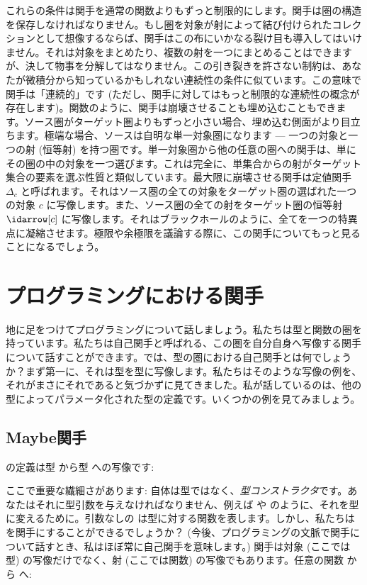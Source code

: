 \noindent
これらの条件は関手を通常の関数よりもずっと制限的にします。関手は圏の構造を保存しなければなりません。もし圏を対象が射によって結び付けられたコレクションとして想像するならば、関手はこの布にいかなる裂け目も導入してはいけません。それは対象をまとめたり、複数の射を一つにまとめることはできますが、決して物事を分解してはなりません。この引き裂きを許さない制約は、あなたが微積分から知っているかもしれない連続性の条件に似ています。この意味で関手は「連続的」です (ただし、関手に対してはもっと制限的な連続性の概念が存在します)。関数のように、関手は崩壊させることも埋め込むこともできます。ソース圏がターゲット圏よりもずっと小さい場合、埋め込む側面がより目立ちます。極端な場合、ソースは自明な単一対象圏になります --- 一つの対象と一つの射 (恒等射) を持つ圏です。単一対象圏から他の任意の圏への関手は、単にその圏の中の対象を一つ選びます。これは完全に、単集合からの射がターゲット集合の要素を選ぶ性質と類似しています。最大限に崩壊させる関手は定値関手 $\Delta_c$ と呼ばれます。それはソース圏の全ての対象をターゲット圏の選ばれた一つの対象 $c$ に写像します。また、ソース圏の全ての射をターゲット圏の恒等射 $\idarrow[c]$ に写像します。それはブラックホールのように、全てを一つの特異点に凝縮させます。極限や余極限を議論する際に、この関手についてもっと見ることになるでしょう。

\section{プログラミングにおける関手}

地に足をつけてプログラミングについて話しましょう。私たちは型と関数の圏を持っています。私たちは自己関手と呼ばれる、この圏を自分自身へ写像する関手について話すことができます。では、型の圏における自己関手とは何でしょうか？まず第一に、それは型を型に写像します。私たちはそのような写像の例を、それがまさにそれであると気づかずに見てきました。私が話しているのは、他の型によってパラメータ化された型の定義です。いくつかの例を見てみましょう。

\subsection{Maybe関手}

の定義は型  から型  への写像です: 

ここで重要な繊細さがあります: 自体は型ではなく、\emph{型コンストラクタ}です。あなたはそれに型引数を与えなければなりません、例えば  や  のように、それを型に変えるために。引数なしの  は型に対する関数を表します。しかし、私たちは  を関手にすることができるでしょうか？ (今後、プログラミングの文脈で関手について話すとき、私はほぼ常に自己関手を意味します。) 関手は対象 (ここでは型) の写像だけでなく、射 (ここでは関数) の写像でもあります。任意の関数  から  へ: 

